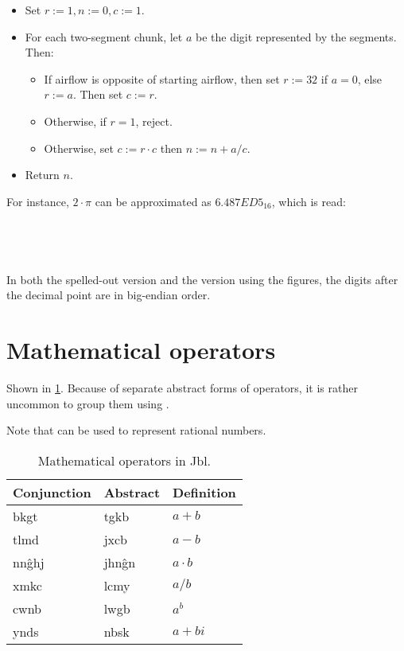 \documentclass{book}
\newcommand{\lname}{Jbl}
\begin{document}
\begin{itemize}
  \item Set $r := 1, n := 0, c := 1$.
  \item For each two-segment chunk, let $a$ be the digit represented by the segments. Then:
  \begin{itemize}
    \item If airflow is opposite of starting airflow, then set $r := 32$ if $a = 0$, else $r := a$. Then set $c := r$.
    \item Otherwise, if $r = 1$, reject.
    \item Otherwise, set $c := r \cdot c$ then $n := n + a / c$.
  \end{itemize}
  \item Return $n$.
\end{itemize}

For instance, $2 \cdot \pi$ can be approximated as $6.487ED5_{16}$, which is read: \\
~\\
 \\
 \\
 \\

In both the spelled-out version and the version using the figures, the digits after the decimal point are in big-endian order.

\section{Mathematical operators}

Shown in \ref{table:operators}. Because of separate abstract forms of operators, it is rather uncommon to group them using .

Note that  can be used to represent rational numbers.

\begin{table}[ht]
  \caption{Mathematical operators in \lname. \label{table:operators}}
  \centering
  \begin{tabular}{>{\kardinal}l|>{\kardinal}l|l}
    \textnormal{Conjunction} & \textnormal{Abstract} & Definition \\
    \hline
    bkgt & tgkb & $a + b$ \\
    tlmd & jxcb & $a - b$ \\
    nn\^ghj & jhn\^gn & $a \cdot b$ \\
    xmkc & lcmy & $a / b$ \\
    cwnb & lwgb & $a^b$ \\
    ynds & nbsk & $a + bi$ \\
  \end{tabular}
\end{table}
\end{document}
